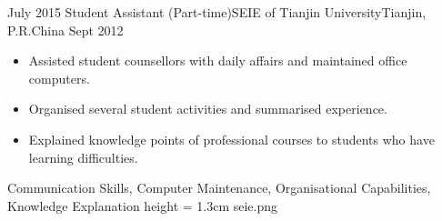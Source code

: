 \begin{experiences}
    
    \experience
    {July 2015}	{Student Assistant (Part-time)}{SEIE of Tianjin University}{Tianjin, P.R.China}
    {Sept 2012}	{
    				\begin{itemize}
                    	\item Assisted student counsellors with daily affairs and maintained office computers. 
    					\item Organised several student activities and summarised experience.
                        \item Explained knowledge points of professional courses to students who have learning difficulties.
    				\end{itemize}
    			}
                {Communication Skills, Computer Maintenance, Organisational Capabilities, Knowledge Explanation}
     {height = 1.3cm}		{seie.png} 
    
\end{experiences}